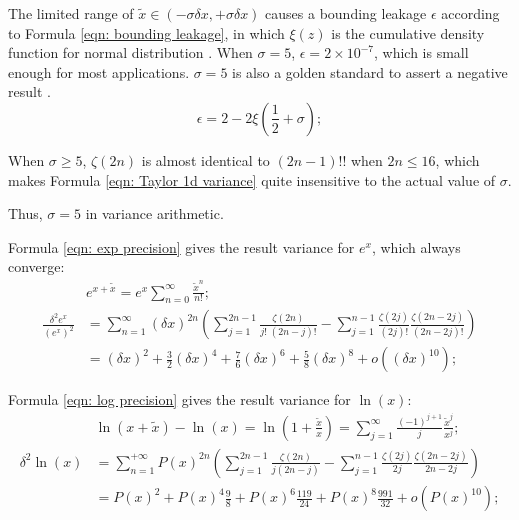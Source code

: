 \documentclass[twoside]{article}
\numberwithin{equation}{section}
\begin{document}
The limited range of $\tilde{x} \in (-\sigma \delta x, +\sigma \delta x)$ causes a bounding leakage $\epsilon$ according to Formula \eqref{eqn: bounding leakage}, in which $\xi(z)$ is the cumulative density function for normal distribution \cite{Probability_Statistics}.
When $\sigma = 5$, $\epsilon = 2 \times 10^{-7}$, which is small enough for most applications.
$\sigma = 5$ is also a golden standard to assert a negative result \cite{Precisions_Physical_Measurements}.
\begin{equation}
\label{eqn: bounding leakage}
\epsilon = 2 - 2 \xi(\frac{1}{2} + \sigma);
\end{equation}

When $\sigma \geq 5$, $\zeta(2n)$ is almost identical to $(2n -1)!!$ when $2n \leq 16$, which makes Formula \eqref{eqn: Taylor 1d variance} quite insensitive to the actual value of $\sigma$.

Thus, $\sigma = 5$ in variance arithmetic.

Formula \eqref{eqn: exp precision} gives the result variance for $e^x$, which always converge:
\begin{align}
\label{eqn: exp Taylor}
& e^{x + \tilde{x}} = e^x \sum_{n=0}^{\infty} \frac{\tilde{x}^n}{n!}; \\
\label{eqn: exp precision}
\frac{\delta^2 e^x}{(e^x)^2} &= \sum_{n=1}^{\infty} (\delta x)^{2n}  \left( \sum_{j=1}^{2n-1} \frac{\zeta(2n)}{j!\;(2n - j)!} 
 -\sum_{j=1}^{n-1} \frac{\zeta(2j)}{(2j)!} \frac{\zeta(2n - 2j)}{(2n - 2j)!} \right) \\
 &= (\delta x)^2 + \frac{3}{2} (\delta x)^4 + \frac{7}{6} (\delta x)^6 + \frac{5}{8} (\delta x)^8 + o((\delta x)^{10});
\end{align}

Formula \eqref{eqn: log precision} gives the result variance for $\ln(x)$:
\begin{align}
\label{eqn: log Taylor}
& \ln(x + \tilde{x}) - \ln(x) = \ln(1 + \frac{\tilde{x}}{x}) = \sum_{j=1}^{\infty} \frac{(-1)^{j+1}}{j} \frac{\tilde{x}^j}{x^j}; \\
\label{eqn: log precision}
\delta^2 \ln(x) &= \sum_{n=1}^{+\infty} P(x)^{2n} \left(\sum_{j=1}^{2n-1} \frac{\zeta(2n)}{j (2n-j)}
   - \sum_{j=1}^{n-1} \frac{\zeta(2j)}{2j} \frac{\zeta(2n - 2j)}{2n - 2j} \right) \\
 &= P(x)^2 + P(x)^4 \frac{9}{8}  + P(x)^6 \frac{119}{24} + P(x)^8 \frac{991}{32} + o(P(x)^{10}); 
\end{align}
\end{document}
